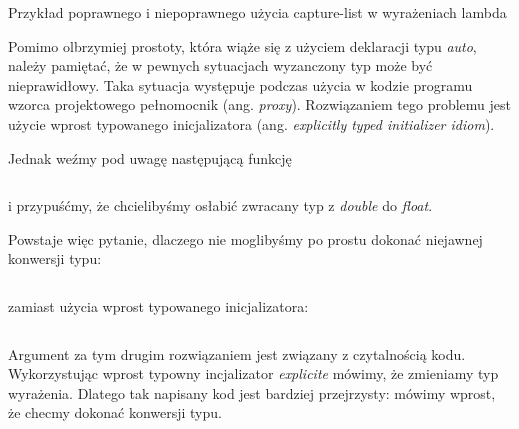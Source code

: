\documentclass{pracamgr}
\begin{document}
\begin{listing}[H]
\inputminted[mathescape, linenos, numbersep=5pt, bgcolor=bg, rulecolor=\color{darkgray}, frame=lines, framesep=2mm]{cpp}{listings/auto.cpp}
\caption{Przykład poprawnego i niepoprawnego użycia capture-list w wyrażeniach lambda}
\label{lst:auto}
\end{listing}

Pomimo olbrzymiej prostoty, która wiąże się z użyciem deklaracji typu \textit{auto}, 
należy pamiętać, że w pewnych sytuacjach
wyzanczony typ może być nieprawidłowy. Taka sytuacja występuje podczas użycia w kodzie programu wzorca 
projektowego pełnomocnik (ang. \textit{proxy}).
Rozwiązaniem tego problemu jest użycie wprost typowanego inicjalizatora (ang. \textit{explicitly typed initializer idiom}).

Jednak weźmy pod uwagę następującą funkcję

\begin{listing}[H]
\inputminted[mathescape,  numbersep=5pt, bgcolor=bg, rulecolor=\color{darkgray}, frame=lines, framesep=2mm]{cpp}{listings/auto/auto1.cpp}  
\end{listing}

i przypuśćmy, że chcielibyśmy osłabić zwracany typ z \textit{double} do \textit{float}.

Powstaje więc pytanie, dlaczego nie moglibyśmy po prostu dokonać niejawnej konwersji typu:

\begin{listing}[H]
\inputminted[numbersep=5pt, bgcolor=bg, rulecolor=\color{darkgray}, frame=lines, framesep=2mm]{cpp}{listings/auto/auto2.cpp}  
\end{listing}

zamiast użycia wprost typowanego inicjalizatora:


\begin{listing}[H]
\inputminted[numbersep=5pt, bgcolor=bg, rulecolor=\color{darkgray}, frame=lines, framesep=2mm]{cpp}{listings/auto/auto3.cpp}  
\end{listing}

Argument za tym drugim rozwiązaniem jest związany z czytalnością kodu. Wykorzystując wprost typowny incjalizator 
\textit{explicite} mówimy, że zmieniamy typ wyrażenia. Dlatego tak napisany kod jest bardziej przejrzysty: mówimy 
wprost, że checmy dokonać konwersji typu.
\end{document}
